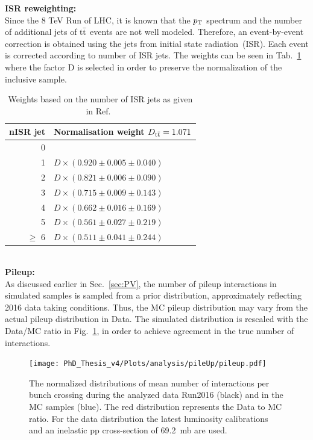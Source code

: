 \textbf{ISR reweighting:}\\
Since the 8 TeV Run of LHC, it is known that the $p_{\rm T}$ spectrum and the number of additional jets of $\rm t\bar{t}$ events are not well modeled. Therefore, an event-by-event correction is obtained using the jets from initial state radiation~(ISR).
 Each event is corrected according to number of ISR jets. The weights can be seen in Tab.~\ref{tab:nISRweights} where the factor D is selected in order to preserve the normalization of the inclusive sample.
 \renewcommand{\arraystretch}{1.5}
\begin{table}[htbp]
\begin{center}
\caption{Weights based on the number of ISR jets as given in Ref.~\cite{nISRweightTTbar}}
\begin{tabular}{|r|l|}
\hline
\multicolumn{1}{|l|}{nISR jet} & Normalisation weight $D_{\rm t\bar{t}} = 1.071$ \\ \hline
0 &  \\ \hline
1 & $D \times (0.920 \pm 0.005 \pm 0.040)$ \\ \hline
2 & $D \times (0.821 \pm 0.006 \pm 0.090)$ \\ \hline
3 & $D \times (0.715 \pm 0.009 \pm 0.143)$ \\ \hline
4 & $D \times (0.662 \pm 0.016 \pm 0.169)$ \\ \hline
5 & $D \times (0.561 \pm 0.027 \pm 0.219)$ \\ \hline
$\geq$ 6& $D \times (0.511 \pm 0.041 \pm 0.244)$ \\ \hline
\end{tabular}
\label{tab:nISRweights}
\end{center}
\end{table}
\\
\renewcommand{\arraystretch}{1}
\textbf{Pileup:}\\
As discussed earlier in Sec.~\ref{sec:PV}, the number of pileup interactions in simulated samples is sampled from a prior distribution, approximately reflecting 2016 data taking conditions. Thus, the MC pileup distribution may vary from the actual pileup distribution in Data. The simulated distribution is rescaled with the Data/MC ratio in Fig.~\ref{fig:pileUpmine}, in order to achieve agreement in the true number of interactions.
\begin{figure}[!h]
  \texttt{[image: PhD\_Thesis\_v4/Plots/analysis/pileUp/pileup.pdf]}
\centering
  \caption[The normalized distributions of mean number of interactions per bunch crossing]{\label{fig:pileUpmine} The normalized distributions of mean number of interactions per bunch crossing during the analyzed data Run2016 (black) and in the MC samples (blue). The red distribution represents the Data to MC ratio. For the data distribution the latest luminosity calibrations~\cite{pileupCMS} and an inelastic pp cross-section of 69.2~mb are used. 
  }
\end{figure}
\newpage
